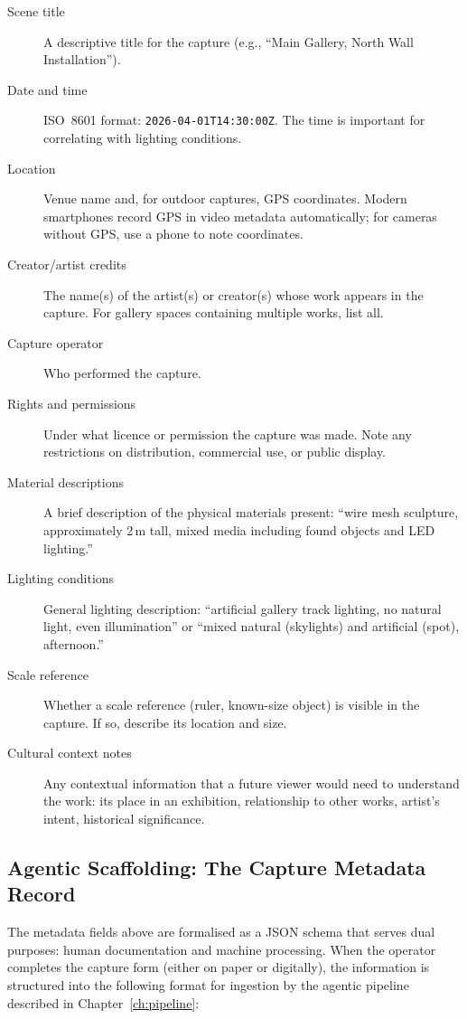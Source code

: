 \begin{description}
  \item[Scene title] A descriptive title for the capture (e.g., ``Main Gallery, North Wall Installation'').
  \item[Date and time] ISO~8601 format: \texttt{2026-04-01T14:30:00Z}. The time is important for correlating with lighting conditions.
  \item[Location] Venue name and, for outdoor captures, GPS coordinates. Modern smartphones record GPS in video metadata automatically; for cameras without GPS, use a phone to note coordinates.
  \item[Creator/artist credits] The name(s) of the artist(s) or creator(s) whose work appears in the capture. For gallery spaces containing multiple works, list all.
  \item[Capture operator] Who performed the capture.
  \item[Rights and permissions] Under what licence or permission the capture was made. Note any restrictions on distribution, commercial use, or public display.
  \item[Material descriptions] A brief description of the physical materials present: ``wire mesh sculpture, approximately 2\,m tall, mixed media including found objects and LED lighting.''
  \item[Lighting conditions] General lighting description: ``artificial gallery track lighting, no natural light, even illumination'' or ``mixed natural (skylights) and artificial (spot), afternoon.''
  \item[Scale reference] Whether a scale reference (ruler, known-size object) is visible in the capture. If so, describe its location and size.
  \item[Cultural context notes] Any contextual information that a future viewer would need to understand the work: its place in an exhibition, relationship to other works, artist's intent, historical significance.
\end{description}

\subsection{Agentic Scaffolding: The Capture Metadata Record}
\label{sec:cap-agentic}

The metadata fields above are formalised as a JSON schema that serves dual purposes: human documentation and machine processing. When the operator completes the capture form (either on paper or digitally), the information is structured into the following format for ingestion by the agentic pipeline described in Chapter~\ref{ch:pipeline}:

